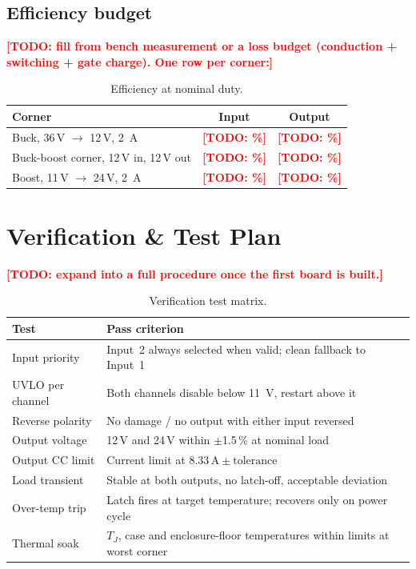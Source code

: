 \documentclass[11pt,a4paper]{article}
\newcommand{\todo}[1]{\textcolor{red}{\textbf{[TODO: #1]}}}
\begin{document}
\subsection{Efficiency budget}
\label{sec:efficiency}
\todo{fill from bench measurement or a loss budget (conduction + switching +
gate charge). One row per corner:}
\begin{table}[H]
  \centering
  \begin{tabular}{@{}lcc@{}}
    \toprule
    \textbf{Corner} & \textbf{Input} & \textbf{Output} \\
    \midrule
    Buck, 36\,V $\rightarrow$ 12\,V, \SI{2}{\A}   & \todo{\%} & \todo{\%} \\
    Buck-boost corner, 12\,V in, 12\,V out        & \todo{\%} & \todo{\%} \\
    Boost, 11\,V $\rightarrow$ 24\,V, \SI{2}{\A}  & \todo{\%} & \todo{\%} \\
    \bottomrule
  \end{tabular}
  \caption{Efficiency at nominal duty.}
\end{table}

\section{Verification \& Test Plan}
\todo{expand into a full procedure once the first board is built.}
\begin{table}[H]
  \centering
  \begin{tabularx}{\linewidth}{@{}lX@{}}
    \toprule
    \textbf{Test} & \textbf{Pass criterion} \\
    \midrule
    Input priority          & Input~2 always selected when valid; clean fallback to Input~1 \\
    UVLO per channel        & Both channels disable below \SI{11}{\V}, restart above it \\
    Reverse polarity        & No damage / no output with either input reversed \\
    Output voltage          & 12\,V and 24\,V within $\pm$1.5\,\% at nominal load \\
    Output CC limit         & Current limit at $8.33\,\text{A} \pm \text{tolerance}$ \\
    Load transient          & Stable at both outputs, no latch-off, acceptable deviation \\
    Over-temp trip          & Latch fires at target temperature; recovers only on power cycle \\
    Thermal soak            & $T_J$, case and enclosure-floor temperatures within limits at worst corner \\
    \bottomrule
  \end{tabularx}
  \caption{Verification test matrix.}
\end{table}
\end{document}
